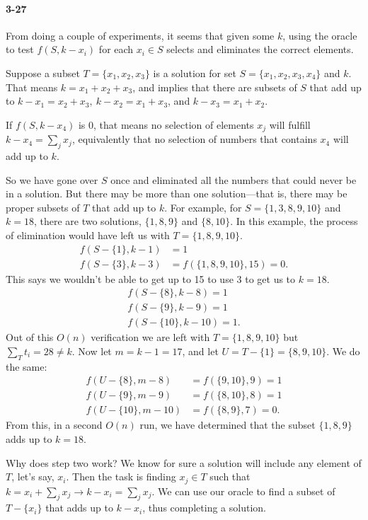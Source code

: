 \documentclass{report}
\begin{document}
\paragraph{3-27} From doing a couple of experiments, it seems that given some $k$, using the oracle to test $f(S, k-x_i)$ for each $x_i\in S$ selects and eliminates the correct elements.

Suppose a subset $T=\{x_1, x_2, x_3\}$ is a solution for set $S=\{x_1, x_2, x_3, x_4\}$ and $k$. That means $k = x_1+x_2+x_3$, and implies that there are subsets of $S$ that add up to $k-x_1=x_2+x_3,\ k-x_2=x_1+x_3$, and $k-x_3=x_1+x_2$.

If $f(S, k-x_4)$ is 0, that means no selection of elements $x_j$ will fulfill $k-x_4=\sum_j x_j$, equivalently that no selection of numbers that contains $x_4$ will add up to $k$.

So we have gone over $S$ once and eliminated all the numbers that could never be in a solution. But there may be more than one solution---that is, there may be proper subsets of $T$ that add up to $k$. For example, for $S=\{1,3,8,9,10\}$ and $k=18$, there are two solutions, $\{1,8,9\}$ and $\{8,10\}$. In this example, the process of elimination would have left us with $T=\{1,8,9,10\}$.
\begin{align*}
	f(S-\{1\}, k-1) &= 1 \\
	f(S-\{3\}, k-3) &= f(\{1,8,9,10\}, 15) = 0.
\end{align*}
This says we wouldn't be able to get up to 15 to use 3 to get us to $k=18$.
\begin{align*}
	f(S-\{8\}, k-8) = 1 \\
	f(S-\{9\}, k-9) = 1 \\
	f(S-\{10\}, k-10) = 1.
\end{align*}
Out of this $O(n)$ verification we are left with $T=\{1,8,9,10\}$ but $\sum_T t_i = 28 \ne k$. Now let $m=k-1=17$, and let $U=T-\{1\}=\{8,9,10\}$. We do the same:
\begin{align*}
	f(U-\{8\}, m-8) &= f(\{9,10\}, 9) = 1 \\
	f(U-\{9\}, m-9) &= f(\{8,10\}, 8) = 1 \\
	f(U-\{10\}, m-10) &= f(\{8,9\}, 7) = 0.
\end{align*}
From this, in a second $O(n)$ run, we have determined that the subset $\{1,8,9\}$ adds up to $k=18$.

Why does step two work? We know for sure a solution will include any element of $T$, let's say, $x_i$. Then the task is finding $x_j\in T$ such that $k = x_i + \sum_j x_j \to k-x_i = \sum_j x_j$. We can use our oracle to find a subset of $T-\{x_i\}$ that adds up to $k-x_i$, thus completing a solution.
\end{document}
